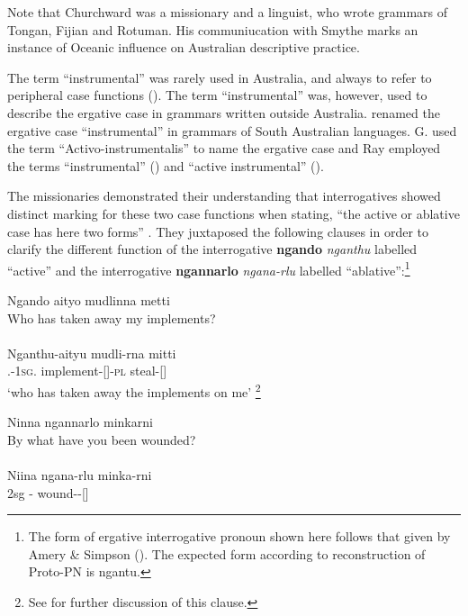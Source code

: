 Note that Churchward was a missionary and a linguist, who wrote grammars of Tongan, Fijian and Rotuman. His communiucation with Smythe marks an instance of Oceanic influence on Australian descriptive practice.

The term “instrumental” was rarely used in Australia, and always to refer to peripheral case functions (). The term “instrumental” was, however, used to describe the ergative case in grammars written outside Australia. \citet{muller_grundris_1882} renamed the ergative case “instrumental” in grammars of South Australian languages. G. \citet{gabelentz_sprachwissenschaft_1891} used the term “Activo-instrumentalis” to name the ergative case and Ray employed the terms “instrumental” (\citealt{ray1897}) and “active instrumental” (\citeyear{ray_linguistics_1907}).

\hspace*{-2.9pt}The missionaries demonstrated their understanding that interrogatives showed distinct marking for these two case functions when stating, “the active or ablative case has here two forms” \citep[9--10]{teichelmann_outlines_1840}. They juxtaposed the following clauses in order to clarify the different function of the interrogative \textbf{ngando} \textit{nganthu} labelled ``active'' and the interrogative \textbf{ngannarlo} \textit{ngana-rlu} labelled ``ablative'':\footnote{The form of ergative interrogative pronoun shown here follows that given by Amery \& Simpson (\citeyear[141]{amery_kulurdu_2013}). The expected form according to reconstruction of Proto-PN \citep[67]{koch_languages_2014} is ngantu.}


\ea\label{ex:5:13}
Ngando    aityo  		 mudlinna                       metti \\
Who has taken away my implements? \\
\citep[10]{teichelmann_outlines_1840} \\
\gll  Nganthu-aityu  		 mudli-rna  	          mitti \\
.-1\textsc{sg}.  	 implement-[]-\textsc{pl}    steal-[]	                         \\
\glt `who has taken away the implements on me' \footnote{See  for further discussion of this clause. }
\z

\ea\label{ex:5:14}
Ninna 	ngannarlo 	minkarni \\
By what have you been wounded? \\
\citep[10]{teichelmann_outlines_1840} \\
\gll Niina	 ngana-rlu            minka-rni	 \\
2sg        - 	wound--[]                                \\
\z

